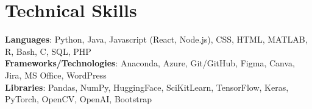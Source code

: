 \section{Technical Skills}
 \begin{itemize}[leftmargin=0.15in, label={}]
    \small{\item{
     \textbf{Languages}{: Python, Java, Javascript (React, Node.js), CSS, HTML, MATLAB, R, Bash, C, SQL, PHP} \\
     \textbf{Frameworks/Technologies}{: Anaconda, Azure, Git/GitHub, Figma, Canva, Jira, MS Office, WordPress} \\
     \textbf{Libraries}{: Pandas, NumPy, HuggingFace, SciKitLearn, TensorFlow, Keras, PyTorch, OpenCV, OpenAI, Bootstrap}
    }}
 \end{itemize}